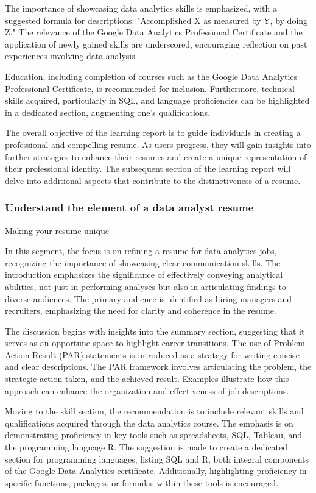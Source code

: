 \documentclass[]{article}
\begin{document}
The importance of showcasing data analytics skills is emphasized, with a suggested formula for descriptions: "Accomplished X as measured by Y, by doing Z." The relevance of the Google Data Analytics Professional Certificate and the application of newly gained skills are underscored, encouraging reflection on past experiences involving data analysis.

Education, including completion of courses such as the Google Data Analytics Professional Certificate, is recommended for inclusion. Furthermore, technical skills acquired, particularly in SQL, and language proficiencies can be highlighted in a dedicated section, augmenting one's qualifications.

The overall objective of the learning report is to guide individuals in creating a professional and compelling resume. As users progress, they will gain insights into further strategies to enhance their resumes and create a unique representation of their professional identity. The subsequent section of the learning report will delve into additional aspects that contribute to the distinctiveness of a resume.

\subsubsection{Understand the element of a data analyst resume}

\uline{Making your resume unique}

In this segment, the focus is on refining a resume for data analytics jobs, recognizing the importance of showcasing clear communication skills. The introduction emphasizes the significance of effectively conveying analytical abilities, not just in performing analyses but also in articulating findings to diverse audiences. The primary audience is identified as hiring managers and recruiters, emphasizing the need for clarity and coherence in the resume.

The discussion begins with insights into the summary section, suggesting that it serves as an opportune space to highlight career transitions. The use of Problem-Action-Result (PAR) statements is introduced as a strategy for writing concise and clear descriptions. The PAR framework involves articulating the problem, the strategic action taken, and the achieved result. Examples illustrate how this approach can enhance the organization and effectiveness of job descriptions.

Moving to the skill section, the recommendation is to include relevant skills and qualifications acquired through the data analytics course. The emphasis is on demonstrating proficiency in key tools such as spreadsheets, SQL, Tableau, and the programming language R. The suggestion is made to create a dedicated section for programming languages, listing SQL and R, both integral components of the Google Data Analytics certificate. Additionally, highlighting proficiency in specific functions, packages, or formulas within these tools is encouraged.
\end{document}
